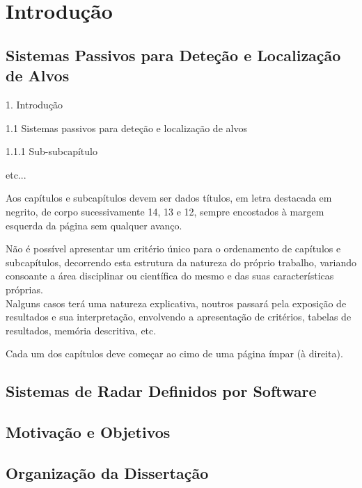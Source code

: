 % 
\chapter{Introdução} %
\label{chap:Chapter1} %


%




\section{Sistemas Passivos para Deteção e Localização de Alvos}


1. Introdução 

1.1 Sistemas passivos para deteção e localização de alvos 

1.1.1 Sub-subcapítulo 

etc...

Aos capítulos e subcapítulos devem ser dados títulos, em letra destacada em negrito, de corpo sucessivamente 14, 13 e 12, sempre encostados à margem esquerda da página sem qualquer avanço.

Não é possível apresentar um critério único para o ordenamento de capítulos e subcapítulos, decorrendo esta estrutura da natureza do próprio trabalho, variando consoante a área disciplinar ou científica do mesmo e das suas características próprias.\\
Nalguns casos terá uma natureza explicativa, noutros passará pela exposição de resultados e sua interpretação, envolvendo a apresentação de critérios, tabelas de resultados, memória descritiva, etc.

Cada um dos capítulos deve começar ao cimo de uma página ímpar (à direita).

\section{Sistemas de Radar Definidos por Software}


\section{Motivação e Objetivos}


\section{Organização da Dissertação}